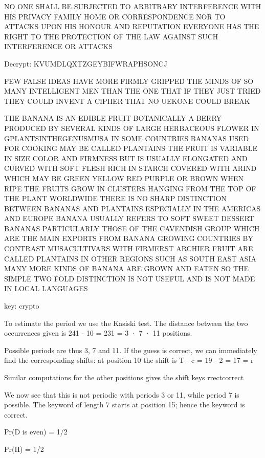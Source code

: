 \documentclass[12pt,a4paper]{article}
\begin{document}
\frontpart

 \exercise
	NO ONE SHALL BE SUBJECTED TO ARBITRARY INTERFERENCE WITH HIS PRIVACY FAMILY HOME OR CORRESPONDENCE NOR TO ATTACKS UPON HIS HONOUR AND REPUTATION EVERYONE HAS THE RIGHT TO THE PROTECTION OF THE LAW AGAINST SUCH INTERFERENCE OR ATTACKS

	Decrypt: KVUMDLQXTZGEYBIFWRAPHSONCJ

 \exercise
 	FEW FALSE IDEAS HAVE MORE FIRMLY GRIPPED THE MINDS OF SO MANY INTELLIGENT MEN THAN THE ONE THAT IF THEY JUST TRIED THEY COULD INVENT A CIPHER THAT NO UEKONE COULD BREAK

 \exercise
 	THE BANANA IS AN EDIBLE FRUIT BOTANICALLY A BERRY PRODUCED BY SEVERAL KINDS OF LARGE HERBACEOUS FLOWER IN GPLANTSINTHEGENUSMUSA IN SOME COUNTRIES BANANAS 
	USED FOR COOKING MAY BE CALLED PLANTAINS THE FRUIT IS VARIABLE IN SIZE COLOR AND FIRMNESS BUT IS USUALLY ELONGATED AND CURVED WITH SOFT FLESH RICH IN STARCH
	COVERED WITH ARIND WHICH MAY BE GREEN YELLOW RED PURPLE OR BROWN WHEN RIPE THE FRUITS GROW IN CLUSTERS HANGING FROM THE TOP OF THE PLANT WORLDWIDE
	THERE IS NO SHARP DISTINCTION BETWEEN BANANAS AND PLANTAINS ESPECIALLY IN THE AMERICAS AND EUROPE BANANA USUALLY REFERS TO SOFT SWEET DESSERT BANANAS 
	PARTICULARLY THOSE OF THE CAVENDISH GROUP WHICH ARE THE MAIN EXPORTS FROM BANANA GROWING COUNTRIES BY CONTRAST MUSACULTIVARS WITH FIRMERST ARCHIER FRUIT ARE CALLED 
	PLANTAINS IN OTHER REGIONS SUCH AS SOUTH EAST ASIA MANY MORE KINDS OF BANANA ARE GROWN AND EATEN SO THE SIMPLE TWO FOLD DISTINCTION IS NOT USEFUL AND IS NOT 
	MADE IN LOCAL LANGUAGES

	key: crypto


 \exercise
 To estimate the period we use the Kasiski test. The distance between the two occurrences
 given is
 241 - 10 = 231 = 3 · 7 · 11
 positions.
 
 Possible periods are thus 3, 7 and 11. If the guess is correct, we can immediately find the
 corresponding shifts: at position 10 the shift is
 T - c = 19 - 2 = 17 = r
 
 Similar computations for the other positions gives the shift keys
 rrectcorrect
 
 We now see that this is not periodic with periods 3 or 11, while period 7 is possible. The keyword
 of length 7 starts at position 15; hence the keyword is
 correct. 


 \exercise

   	Pr(D is even) = 1/2
  

  	Pr(H) = 1/2
\end{document}
